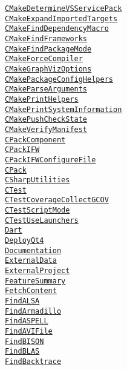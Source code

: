 \documentclass{article}
\newcommand{\cmakemodule}[1]{{\href{https://cmake.org/cmake/help/v3.13/module/#1.html}{{\lstinline{#1}}}}}
\begin{document}
\begin{minipage}[t]{0.18\linewidth}
\cmakemodule{CMakeDetermineVSServicePack}\\
\cmakemodule{CMakeExpandImportedTargets}\\
\cmakemodule{CMakeFindDependencyMacro}\\
\cmakemodule{CMakeFindFrameworks}\\
\cmakemodule{CMakeFindPackageMode}\\
\cmakemodule{CMakeForceCompiler}\\
\cmakemodule{CMakeGraphVizOptions}\\
\cmakemodule{CMakePackageConfigHelpers}\\
\cmakemodule{CMakeParseArguments}\\
\cmakemodule{CMakePrintHelpers}\\
\cmakemodule{CMakePrintSystemInformation}\\
\cmakemodule{CMakePushCheckState}\\
\cmakemodule{CMakeVerifyManifest}\\
\cmakemodule{CPackComponent}\\
\cmakemodule{CPackIFW}\\
\cmakemodule{CPackIFWConfigureFile}\\
\cmakemodule{CPack}\\
\cmakemodule{CSharpUtilities}\\
\cmakemodule{CTest}\\
\cmakemodule{CTestCoverageCollectGCOV}\\
\cmakemodule{CTestScriptMode}\\
\cmakemodule{CTestUseLaunchers}\\
\cmakemodule{Dart}\\
\cmakemodule{DeployQt4}\\
\cmakemodule{Documentation}\\
\cmakemodule{ExternalData}\\
\cmakemodule{ExternalProject}\\
\cmakemodule{FeatureSummary}\\
\cmakemodule{FetchContent}\\
\cmakemodule{FindALSA}\\
\cmakemodule{FindArmadillo}\\
\cmakemodule{FindASPELL}\\
\cmakemodule{FindAVIFile}\\
\cmakemodule{FindBISON}\\
\cmakemodule{FindBLAS}\\
\cmakemodule{FindBacktrace}\\

\end{minipage}
\end{document}
